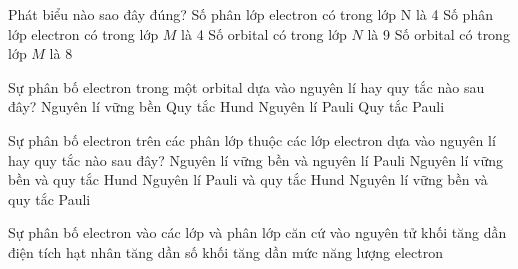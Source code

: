 \documentclass[Main.tex]{subfiles}
\begin{document}
\begin{vdex}
	Phát biểu nào sao đây đúng?
	\choice
	{\True Số phân lớp electron có trong lớp N là 4}
	{Số phân lớp electron có trong lớp $M$ là 4}
	{Số orbital có trong lớp $N$ là 9}
	{Số orbital có trong lớp $M$ là 8}
\end{vdex}
\begin{vd}
	Sự phân bố electron trong một orbital dựa vào nguyên lí hay quy tắc nào sau đây?
	\choice
	{Nguyên lí vững bền}
	{Quy tắc Hund}
	{\True Nguyên lí Pauli}
	{Quy tắc Pauli}
\end{vd}

\begin{vdex}
	Sự phân bố electron trên các phân lớp thuộc các lớp electron dựa vào nguyên lí hay quy tắc nào sau đây?
	\choice
	{Nguyên lí vững bền và nguyên lí Pauli}
	{\True Nguyên lí vững bền và quy tắc Hund}
	{Nguyên lí Pauli và quy tắc Hund}
	{Nguyên lí vững bền và quy tắc Pauli}
\end{vdex}

\begin{vdex}
	Sự phân bố electron vào các lớp và phân lớp căn cứ vào
	\choice
	{nguyên tử khối tăng dần}
	{điện tích hạt nhân tăng dần}
	{số khối tăng dần}
	{\True mức năng lượng electron}
	\loigiai{}
\end{vdex}
\end{document}
